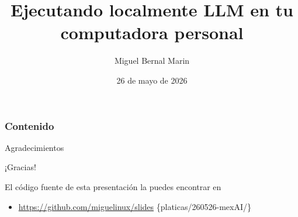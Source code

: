 \documentclass[aspectratio=169]{beamer}
\title[LLM Local]{Ejecutando localmente LLM en
tu computadora personal}
\author[\textcircled{cc} BY-SA 4.0]{Miguel Bernal Marin}
\institute[MexAI Community]
{
MexAI Community \\
\medskip
\textit{\href{mailto:miguel.bernal.marin@gmail.com}{miguel.bernal.marin@gmail.com}}\\
Telegram: \textit{\href{https://t.me/miguelinux}{@miguelinux}}
}
\date{
  26 de mayo de 2026
}
\begin{document}
\begin{frame}
    \titlepage
\end{frame}



\begin{frame}
    \frametitle{Contenido}
    \tableofcontents
\end{frame}



\begin{frame}{Agradecimientos}

  \begin{center}
    \huge ¡Gracias!
  \end{center}

  El código fuente de esta presentación la puedes encontrar en
  \begin{itemize}
    \item \href{https://github.com/miguelinux/slides}
      {https://github.com/miguelinux/slides}
      \{platicas/260526-mexAI/\}

  \end{itemize}
\end{frame}
\end{document}

